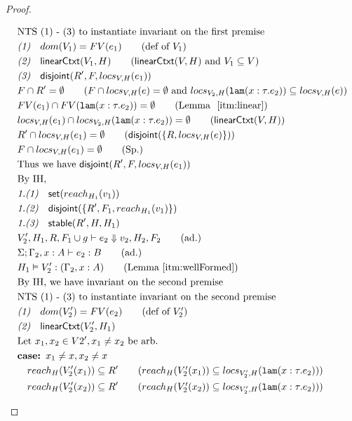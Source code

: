 \documentclass{easychair}
\newcommand{\ms}[1]{\ensuremath{\mathsf{#1}}}
\newcommand{\irl}[1]{\mathtt{#1}}
\newcommand{\na}[1]{\mathsf{linearCtxt}(#1)}
\newcommand{\stable}[1]{\mathsf{stable}(#1)}
\newcommand{\dist}[1]{\mathsf{disjoint}(#1)}
\theoremstyle{definition}
\begin{document}
\begin{proof}
\begin{description}
\begin{align*}
		&\text{NTS (1) - (3) to instantiate invariant on the first premise}\\
  &\emph{(1)}\quad dom(V_1) = FV(e_1) \tag{def of $V_1$}\\
  &\emph{(2)}\quad \na{V_1,H} \tag{$\na{V,H}$ and $V_1 \subseteq V$}\\
  &\emph{(3)}\quad \dist{R',F,locs_{V,H}(e_1)}\\
  &F \cap R' = \emptyset \tag{$F \cap locs_{V,H}(e) = \emptyset$ and $locs_{V_2,H}(\irl{lam}(x : \tau. e_2)) \subseteq locs_{V,H}(e)$}\\
  &FV(e_1) \cap FV(\irl{lam}(x : \tau. e_2)) = \emptyset \tag{Lemma ~\ref{itm:linear}}\\
  &locs_{V,H}(e_1) \cap locs_{V_2,H}(\irl{lam}(x : \tau. e_2)) = \emptyset \tag{$\na{V,H}$}\\
  &R' \cap locs_{V,H}(e_1) = \emptyset \tag{$\dist{\{R,locs_{V,H}(e)\}}$}\\
  &F \cap locs_{V,H}(e_1) = \emptyset \tag{Sp.}\\
  &\text{Thus we have } \dist{R',F,locs_{V,H}(e_1)}\\
  &\text{By IH, }\\
  &\emph{1.(1)}\quad \ms{set}(reach_{H_1}(v_1))\\
  &\emph{1.(2)}\quad \dist{\{R',F_1,reach_{H_1}(v_1)\}}\\
  &\emph{1.(3)}\quad \stable{R',H,H_1}\\
  &V_2',H_1,R, F_1 \cup g \vdash e_2 \Downarrow v_2,H_2,F_2 \tag{ad.} \\
  &\Sigma; \Gamma_2, x : A \vdash e_2 : B \tag{ad.}\\
		&H_1 \vDash V_2' : (\Gamma_2, x : A) \tag{Lemma~\ref{itm:wellFormed}}\\
  &\text{By IH, we have invariant on the second premise } \\
		&\text{NTS (1) - (3) to instantiate invariant on the second premise}\\
  &\emph{(1)}\quad dom(V_2') = FV(e_2) \tag{def of $V_2'$}\\
  &\emph{(2)}\quad \na{V_2',H_1}\\
  &\text{Let } x_1, x_2 \in V2', x_1 \ne x_2 \text{ be arb.}\\
  &\textbf{case: } x_1 \ne x, x_2 \ne x\\
  &\quad reach_H(V_2'(x_1)) \subseteq R' \tag{$reach_H(V_2'(x_1)) \subseteq locs_{V_2',H}(\irl{lam}(x : \tau. e_2))$}\\
  &\quad reach_H(V_2'(x_2)) \subseteq R' \tag{$reach_H(V_2'(x_2)) \subseteq locs_{V_2',H}(\irl{lam}(x : \tau. e_2))$}\\

\end{align*}
\end{description}
\end{proof}
\end{document}
